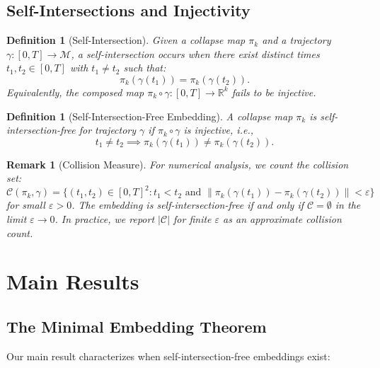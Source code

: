 \documentclass[12pt]{article}
\newtheorem{definition}[theorem]{Definition}
\newtheorem{remark}[theorem]{Remark}
\newcommand{\R}{\mathbb{R}}
\newcommand{\M}{\mathcal{M}}
\begin{document}
\subsection{Self-Intersections and Injectivity}

\begin{definition}[Self-Intersection]\label{def:intersection}
Given a collapse map $\pi_k$ and a trajectory $\gamma: [0,T] \to \M$, a \emph{self-intersection} occurs when there exist distinct times $t_1, t_2 \in [0,T]$ with $t_1 \neq t_2$ such that:
\begin{equation}
    \pi_k(\gamma(t_1)) = \pi_k(\gamma(t_2)).
\end{equation}
Equivalently, the composed map $\pi_k \circ \gamma: [0,T] \to \R^k$ fails to be injective.
\end{definition}

\begin{definition}[Self-Intersection-Free Embedding]\label{def:sif}
A collapse map $\pi_k$ is \emph{self-intersection-free} for trajectory $\gamma$ if $\pi_k \circ \gamma$ is injective, i.e.,
\[
t_1 \neq t_2 \implies \pi_k(\gamma(t_1)) \neq \pi_k(\gamma(t_2)).
\]
\end{definition}

\begin{remark}[Collision Measure]
For numerical analysis, we count the \emph{collision set}:
\begin{equation}
    \mathcal{C}(\pi_k, \gamma) = \{(t_1, t_2) \in [0,T]^2 : t_1 < t_2 \text{ and } \|\pi_k(\gamma(t_1)) - \pi_k(\gamma(t_2))\| < \varepsilon\}
\end{equation}
for small $\varepsilon > 0$. The embedding is self-intersection-free if and only if $\mathcal{C} = \emptyset$ in the limit $\varepsilon \to 0$. In practice, we report $|\mathcal{C}|$ for finite $\varepsilon$ as an approximate collision count.
\end{remark}

\section{Main Results}

\subsection{The Minimal Embedding Theorem}

Our main result characterizes when self-intersection-free embeddings exist:
\end{document}

